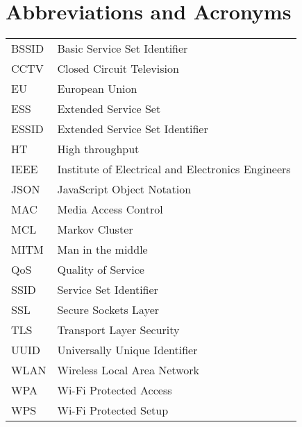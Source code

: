 \chapter*{Abbreviations and Acronyms}


\noindent
\begin{longtable}{@{}p{}p{}@{}}
BSSID & Basic Service Set Identifier \\
CCTV & Closed Circuit Television \\
EU & European Union \\
ESS & Extended Service Set \\
ESSID & Extended Service Set Identifier \\
HT & High throughput \\
IEEE & Institute of Electrical and Electronics Engineers \\
JSON & JavaScript Object Notation \\
MAC & Media Access Control \\
MCL & Markov Cluster \\
MITM & Man in the middle \\
QoS & Quality of Service \\
SSID & Service Set Identifier \\
SSL & Secure Sockets Layer \\
TLS & Transport Layer Security \\
UUID & Universally Unique Identifier \\
WLAN & Wireless Local Area Network \\
WPA & Wi-Fi Protected Access \\
WPS & Wi-Fi Protected Setup \\
\end{longtable}
